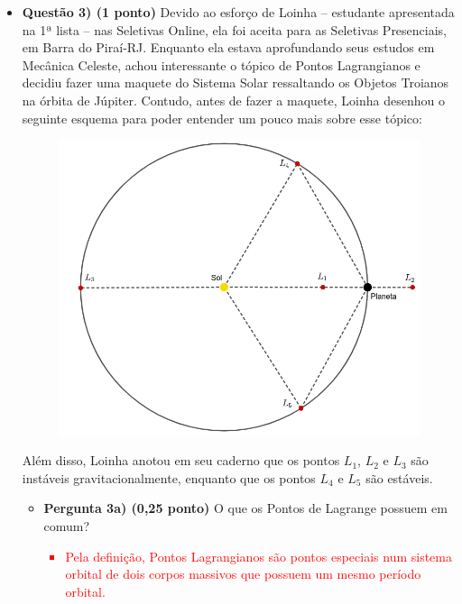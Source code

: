 \documentclass[a4paper, 12pt]{article}
\newcommand{\red}[1]
{
	\textcolor{red}{#1}
}
\begin{document}
\begin{flushleft}
\begin{itemize}
		\item \textbf{Questão 3) (1 ponto)} Devido ao esforço de Loinha -- estudante apresentada na 1ª lista -- nas Seletivas Online, ela foi aceita para as Seletivas Presenciais, em Barra do Piraí-RJ. Enquanto ela estava aprofundando seus estudos em Mecânica Celeste, achou interessante o tópico de Pontos Lagrangianos e decidiu fazer uma maquete do Sistema Solar ressaltando os Objetos Troianos na órbita de Júpiter. \linebreak \linebreak
			Contudo, antes de fazer a maquete, Loinha desenhou o seguinte esquema para poder entender um pouco mais sobre esse tópico:
			\begin{figure}[H]
				\centering
				\includegraphics[scale=0.5]{./img/3.png}
			\end{figure}
			Além disso, Loinha anotou em seu caderno que os pontos $L_1$, $L_2$ e $L_3$ são instáveis gravitacionalmente, enquanto que os pontos $L_4$ e $L_5$ são estáveis.
			\begin{itemize}
				\item \textbf{Pergunta 3a) (0,25 ponto)} O que os Pontos de Lagrange possuem em comum?
					\red{\begin{itemize}
							\item Pela definição, Pontos Lagrangianos são pontos especiais num sistema orbital de dois corpos massivos que possuem um mesmo período orbital.
					\end{itemize}}
					\begin{itemize}

\end{itemize}
\end{itemize}
\end{itemize}
\end{flushleft}
\end{document}
